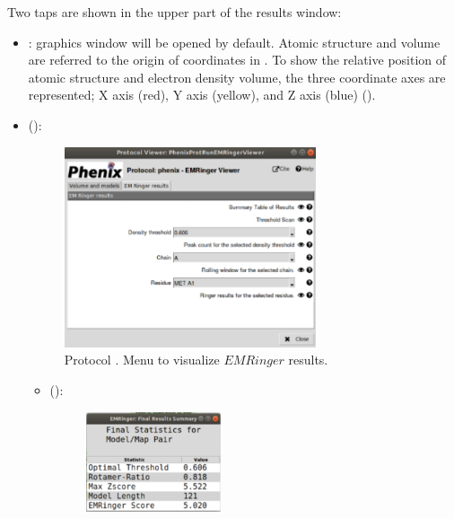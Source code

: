 \begin{itemize}
   Two taps are shown in the upper part of the results window:
    \begin{itemize}
     \item {}: \chimera graphics window will be opened by default. Atomic structure and volume are referred to the origin of coordinates in \chimera. To show the relative position of atomic structure and electron density volume, the three coordinate axes are represented; X axis (red), Y axis (yellow), and Z axis (blue) ().\\

     \item {} ():
     
     \begin{figure}[H]
     \centering 
     \captionsetup{width=.7\linewidth} 
     \includegraphics[width=0.70\textwidth]{Images_appendix/Fig141.pdf}
     \caption{Protocol . Menu to visualize $EMRinger$ results.}
     \label{fig:app_protocol_emringer_3}
    \end{figure}
      \begin{itemize}
        \item {} ():
        \begin{figure}[H]
         \centering 
         \captionsetup{width=.7\linewidth} 
         \includegraphics[width=0.40\textwidth]{Images_appendix/Fig142.pdf}

\end{figure}
\end{itemize}
\end{itemize}
\end{itemize}
